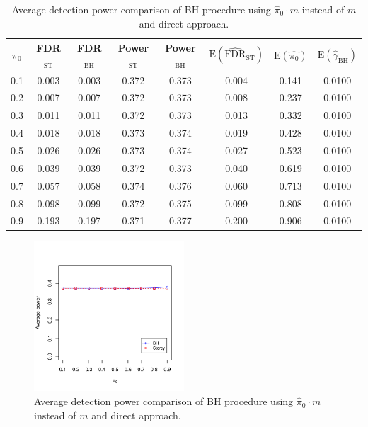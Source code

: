 \documentclass[10pt]{article}
\begin{document}
\begin{table}[H]
	\centering	
	\begin{tabular}{cccccccc}
		$\pi_{0}$ & FDR$_{\text{ST}}$ & FDR$_{\text{BH}}$ & Power$_{\text{ST}}$ & Power$_{\text{BH}}$ & $\text{E} (\widehat{\text{FDR}}_{\text{ST}} )$ & $\text{E}(\widehat{\pi_{0}})$ & $\text{E}(\widehat{\gamma}_{\text{BH}})$ \\ 
		\hline
		0.1 & 0.003 & 0.003 & 0.372 & 0.373 & 0.004 & 0.141 & 0.0100 \\ 
		0.2 & 0.007 & 0.007 & 0.372 & 0.373 & 0.008 & 0.237 & 0.0100 \\ 
		0.3 & 0.011 & 0.011 & 0.372 & 0.373 & 0.013 & 0.332 & 0.0100 \\ 
		0.4 & 0.018 & 0.018 & 0.373 & 0.374 & 0.019 & 0.428 & 0.0100 \\ 
		0.5 & 0.026 & 0.026 & 0.373 & 0.374 & 0.027 & 0.523 & 0.0100 \\ 
		0.6 & 0.039 & 0.039 & 0.372 & 0.373 & 0.040 & 0.619 & 0.0100 \\ 
		0.7 & 0.057 & 0.058 & 0.374 & 0.376 & 0.060 & 0.713 & 0.0100 \\ 
		0.8 & 0.098 & 0.099 & 0.372 & 0.375 & 0.099 & 0.808 & 0.0100 \\ 
		0.9 & 0.193 & 0.197 & 0.371 & 0.377 & 0.200 & 0.906 & 0.0100 \\ 
		\hline
	\end{tabular}
	\caption{Average detection power comparison of BH procedure using $\widehat{\pi}_{0} \cdot m$ instead of $m$ and direct approach.}
	\label{tab: power_pi0_BH}	
\end{table}


\begin{figure}[H]
	\centering
	\includegraphics[width=0.5\textwidth]{../data/power_pi0_BH.pdf}
	\caption{Average detection power comparison of BH procedure using $\widehat{\pi}_{0} \cdot m$ instead of $m$ and direct approach.}
	\label{fig: power_pi0_BH}	
\end{figure}
\end{document}

